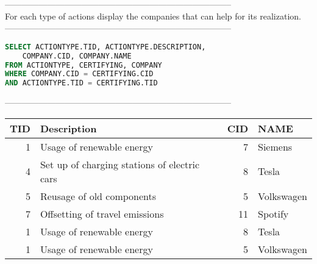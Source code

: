 --------------------------------------------------------------------------------
\\For each type of actions display the companies that can help for its realization.\\
--------------------------------------------------------------------------------
\begin{lstlisting}[language = SQL]
SELECT ACTIONTYPE.TID, ACTIONTYPE.DESCRIPTION,
	COMPANY.CID, COMPANY.NAME 
FROM ACTIONTYPE, CERTIFYING, COMPANY 
WHERE COMPANY.CID = CERTIFYING.CID 
AND ACTIONTYPE.TID = CERTIFYING.TID
\end{lstlisting}
--------------------------------------------------------------------------------
\\\begin{tabular}{rlrl}
\toprule
   TID & Description                                  &   CID & NAME       \\
\midrule
     1 & Usage of renewable energy                    &     7 & Siemens    \\
     4 & Set up of charging stations of electric cars &     8 & Tesla      \\
     5 & Reusage of old components                    &     5 & Volkswagen \\
     7 & Offsetting of travel emissions               &    11 & Spotify    \\
     1 & Usage of renewable energy                    &     8 & Tesla      \\
     1 & Usage of renewable energy                    &     5 & Volkswagen \\
\bottomrule
\end{tabular}